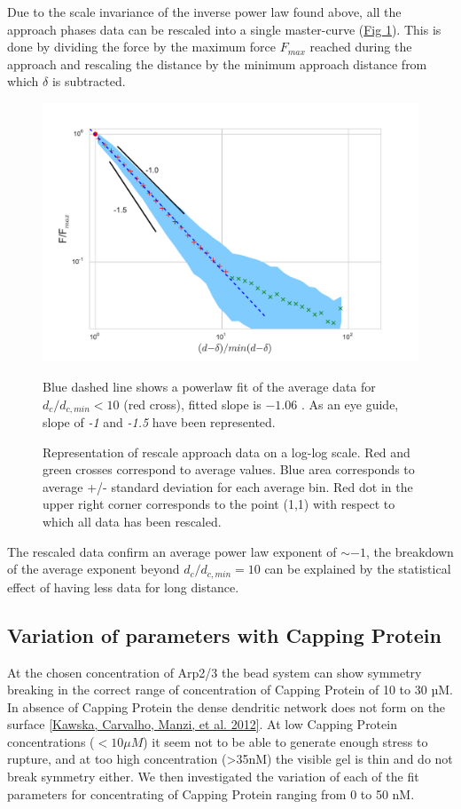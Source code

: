 \documentclass[A4paperpaper,11pt,english]{sphinxmanual}
\begin{document}
Due to the scale invariance of the inverse power law found above,  all the
approach phases data can be rescaled into a single master-curve (\hyperref[index-latex:fig-rescale-powerlaw]{Fig  \ref*{index-latex:fig-rescale-powerlaw}}). This is done
by dividing the force by the maximum force \(F_{max}\) reached during the
approach and rescaling the distance by the minimum approach distance from which
\(\delta\) is subtracted.
\begin{figure}[htbp]
\centering
\capstart

\includegraphics[width=0.700\linewidth]{rescaled_powerlaw.pdf}
\caption{Representation of rescale approach data on a log-log scale.  Red and green
crosses correspond to average values. Blue area corresponds to average +/-
standard deviation for each average bin. Red dot in the upper right corner
corresponds to the point (1,1) with respect to which all data has been
rescaled.}{\small 
Blue dashed line shows a powerlaw fit of the average data for
\(d_c/d_{c,min} < 10\) (red cross), fitted slope is \(-1.06\) .
As an eye guide, slope of \emph{-1} and \emph{-1.5} have been represented.
}\label{index-latex:fig-rescale-powerlaw}\end{figure}

The rescaled data confirm an average power law exponent of \(\sim -1\), the
breakdown of the average exponent beyond \(d_c/d_{c,min}=10\) can be
explained by the statistical effect of having less data for long distance.


\subsection{Variation of parameters with Capping Protein}
\label{index-latex:variation-of-parameters-with-capping-protein}
At the chosen concentration of Arp2/3 the bead system can show symmetry
breaking in the correct range of concentration of Capping Protein of 10 to 30
µM. In absence of Capping Protein the dense dendritic network does not form on
the surface {\hyperref[index-latex:kawska2012]{{[}Kawska, Carvalho, Manzi,  et al.  2012{]}}}. At low Capping Protein concentrations (\(<10 \mu{}M\)) it seem not to be able to generate enough stress to
rupture, and at too high concentration (\textgreater{}35nM) the visible gel is thin and do
not break symmetry either. We then investigated the variation of each of the
fit parameters for concentrating of Capping Protein ranging from 0 to 50 nM.
\end{document}
